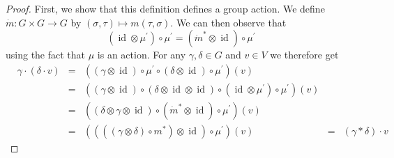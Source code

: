 \begin{proof}
  First, we show that this definition defines a group action.
  We define $\dot{m} \colon G \times G \longrightarrow G$ by $(\sigma,\tau) \mapsto m(\tau,\sigma)$.
  We can then observe that
  \begin{equation}
    (\operatorname{id} \otimes \mu^\prime)\circ\mu^\prime = (\dot{m}^\ast \otimes \operatorname{id}) \circ \mu^\prime
  \end{equation}
  using the fact that $\mu$ is an action.
  For any $\gamma,\delta \in G$ and $v \in V$ we therefore get
  \begin{equation}
    \begin{aligned}
      & \gamma \cdot (\delta \cdot v)
      &=& ((\gamma \otimes \operatorname{id})\circ\mu^\prime\circ(\delta \otimes \operatorname{id})\circ\mu^\prime)(v)\\
      &&=& ((\gamma \otimes \operatorname{id})\circ(\delta \otimes \operatorname{id}\otimes\operatorname{id})\circ(\operatorname{id}\otimes\mu^\prime)\circ\mu^\prime)(v)\\
      &&=& ((\delta\otimes\gamma\otimes\operatorname{id})\circ(\dot{m}^\ast\otimes\operatorname{id})\circ\mu^\prime)(v)\\
      &&=& ((((\gamma\otimes\delta)\circ m^\ast)\otimes\operatorname{id})\circ\mu^\prime)(v)
      &=& (\gamma \ast \delta) \cdot v
    \end{aligned}
  \end{equation}
  

\end{proof}
